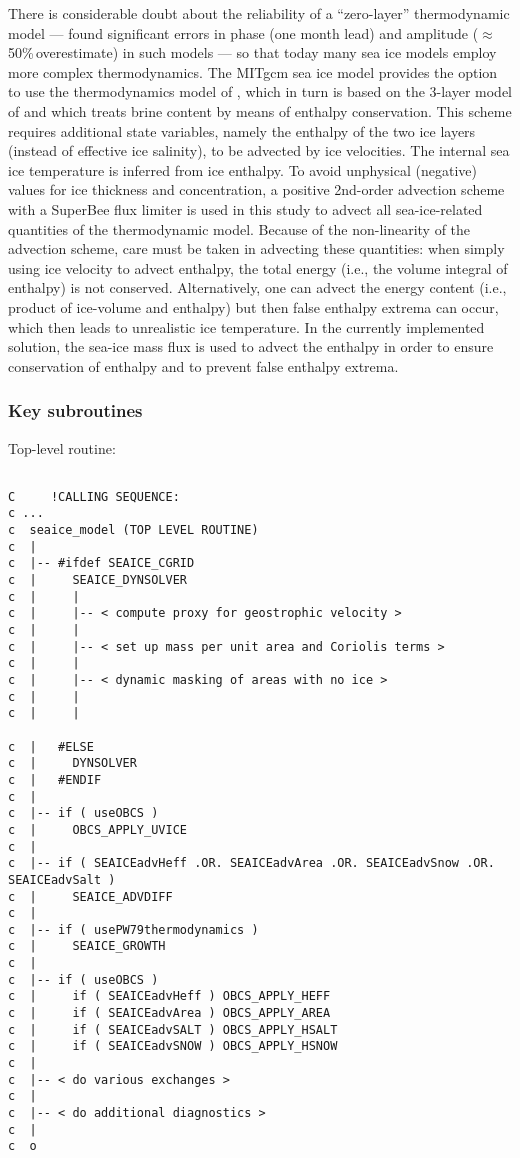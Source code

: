 There is considerable doubt about the reliability of a ``zero-layer''
thermodynamic model --- \citet{semtner84} found significant errors in
phase (one month lead) and amplitude ($\approx$50\%\,overestimate) in
such models --- so that today many sea ice models employ more complex
thermodynamics. The MITgcm sea ice model provides the option to use
the thermodynamics model of \citet{win00}, which in turn is based
on the 3-layer model of \citet{sem76} and which treats brine
content by means of enthalpy conservation. This scheme requires
additional state variables, namely the enthalpy of the two ice layers
(instead of effective ice salinity), to be advected by ice velocities.
%
The internal sea ice temperature is inferred from ice enthalpy.  To
avoid unphysical (negative) values for ice thickness and
concentration, a positive 2nd-order advection scheme with a SuperBee
flux limiter \citep{roe:85} is used in this study to advect all
sea-ice-related quantities of the \citet{win00} thermodynamic
model.  Because of the non-linearity of the advection scheme, care
must be taken in advecting these quantities: when simply using ice
velocity to advect enthalpy, the total energy (i.e., the volume
integral of enthalpy) is not conserved. Alternatively, one can advect
the energy content (i.e., product of ice-volume and enthalpy) but then
false enthalpy extrema can occur, which then leads to unrealistic ice
temperature.  In the currently implemented solution, the sea-ice mass
flux is used to advect the enthalpy in order to ensure conservation of
enthalpy and to prevent false enthalpy extrema.


\subsubsection{Key subroutines
\label{sec:pkg:seaice:subroutines}}

Top-level routine: 

{\footnotesize
\begin{verbatim}

C     !CALLING SEQUENCE:
c ...
c  seaice_model (TOP LEVEL ROUTINE)
c  |
c  |-- #ifdef SEAICE_CGRID
c  |     SEAICE_DYNSOLVER
c  |     |
c  |     |-- < compute proxy for geostrophic velocity >
c  |     |
c  |     |-- < set up mass per unit area and Coriolis terms >
c  |     |
c  |     |-- < dynamic masking of areas with no ice >
c  |     |
c  |     |

c  |   #ELSE
c  |     DYNSOLVER
c  |   #ENDIF
c  |
c  |-- if ( useOBCS ) 
c  |     OBCS_APPLY_UVICE
c  |
c  |-- if ( SEAICEadvHeff .OR. SEAICEadvArea .OR. SEAICEadvSnow .OR. SEAICEadvSalt )
c  |     SEAICE_ADVDIFF
c  |
c  |-- if ( usePW79thermodynamics ) 
c  |     SEAICE_GROWTH
c  |
c  |-- if ( useOBCS ) 
c  |     if ( SEAICEadvHeff ) OBCS_APPLY_HEFF
c  |     if ( SEAICEadvArea ) OBCS_APPLY_AREA
c  |     if ( SEAICEadvSALT ) OBCS_APPLY_HSALT
c  |     if ( SEAICEadvSNOW ) OBCS_APPLY_HSNOW
c  |
c  |-- < do various exchanges >
c  |
c  |-- < do additional diagnostics >
c  |
c  o

\end{verbatim}
}


